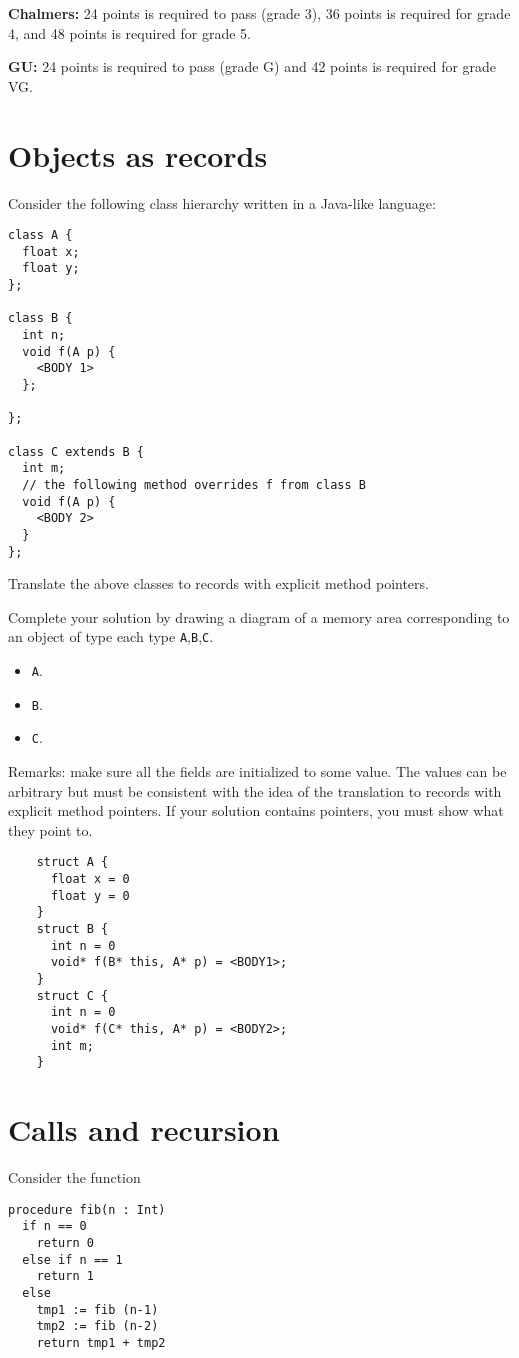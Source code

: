 \documentclass{article}
\newcommand{\answer}[1]{}
\begin{document}
\textbf{Chalmers:}
24 points is required to pass (grade 3), 36 points is required for
grade 4, and 48 points is required for grade 5.

\textbf{GU:}
24 points is required to pass (grade G) and 42 points is
required for grade VG.

\section{Objects as records}

Consider the following class hierarchy written in a Java-like
language:
\begin{verbatim}
class A {
  float x;
  float y;
};

class B {
  int n;
  void f(A p) {
    <BODY 1>
  };

};

class C extends B {
  int m;
  // the following method overrides f from class B
  void f(A p) { 
    <BODY 2>
  }
};
\end{verbatim}

Translate the above classes to records with explicit method pointers. 

Complete your solution by drawing a diagram of a memory area
corresponding to an object of type each type \texttt A,\texttt B,\texttt C.
\begin{itemize}
\item \texttt A. 
\item \texttt B. 
\item \texttt C. 
\end{itemize}
Remarks: make sure all the fields are initialized to some value. The
values can be arbitrary but must be consistent with the idea of the
translation to records with explicit method pointers. If your solution
contains pointers, you must show what they point to.

\answer{}
\begin{verbatim}
    struct A {
      float x = 0
      float y = 0
    }
    struct B {
      int n = 0
      void* f(B* this, A* p) = <BODY1>;
    }
    struct C {
      int n = 0
      void* f(C* this, A* p) = <BODY2>;
      int m;
    }
\end{verbatim}



\newpage
\section{Calls and recursion}
Consider the function
\begin{verbatim}
procedure fib(n : Int)
  if n == 0
    return 0
  else if n == 1
    return 1
  else 
    tmp1 := fib (n-1)
    tmp2 := fib (n-2)
    return tmp1 + tmp2
\end{verbatim}
\end{document}
